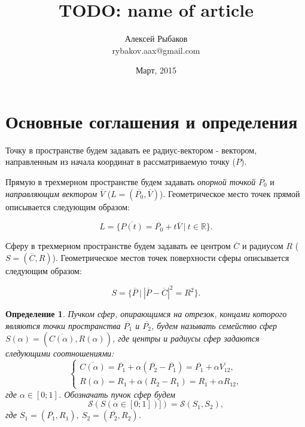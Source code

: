 \documentclass[a4paper,10pt]{extarticle}                     %
\numberwithin{equation}{section}                             %
\numberwithin{figure}{section}                               %
\theoremstyle{plain}                                         %
\newtheorem{definition}{Определение}[section]                %
\begin{document}
\title{TODO: name of article}
\author{Алексей Рыбаков \\ rybakov.aax@gmail.com}
\date{Март, 2015}
\maketitle

\section{Основные соглашения и определения}

Точку в пространстве будем задавать ее радиус-вектором - вектором, направленным из начала координат в рассматриваемую точку ($\overline{P}$).

Прямую в трехмерном пространстве будем задавать \textit{опорной точкой} $\overline{P_0}$ и \textit{направляющим вектором} $\overline{V}$ ($L = (\overline{P_0}, \overline{V})$).
Геометрическое место точек прямой описывается следующим образом:

\begin{equation}
    L = \{ \overline{P(t)} = \overline{P_0} + t\overline{V} \ | \ t \in \mathbb{R} \}.
\end{equation}

Сферу в трехмерном пространстве будем задавать ее центром $\overline{C}$ и радиусом $R$ ($S = (\overline{C}, R)$).
Геометрическое местов точек поверхности сферы описывается следующим образом:

\begin{equation}
    S = \{ \overline{P} \ | \ {|\overline{P} - \overline{C}|}^2 = R^2 \}.
\end{equation}

\begin{definition}
Пучком сфер, опирающимся на отрезок, концами которого являются точки пространства $\overline{P_1}$ и $\overline{P_2}$, будем называть семейство сфер $S(\alpha) = (\overline{C(\alpha)}, R(\alpha))$, где центры и радиусы сфер задаются следующими соотношениями:
\begin{equation}
    \begin{cases}
        \overline{C(\alpha)} = \overline{P_1} + \alpha(\overline{P_2} - \overline{P_1}) = \overline{P_1} + \alpha \overline{V_{12}}, \\
        R(\alpha) = R_1 + \alpha(R_2 - R_1) = R_1 + \alpha R_{12},
    \end{cases}
\end{equation}
где $\alpha \in [0; 1]$.
Обозначать пучок сфер будем
\begin{equation}
    \mathcal{S}(S(\alpha \in [0; 1])]) = \mathcal{S}(S_1, S_2),
\end{equation}
где $S_1 = (\overline{P_1}, R_1), \ S_2 = (\overline{P_2}, R_2)$.
\end{definition}
\end{document}
